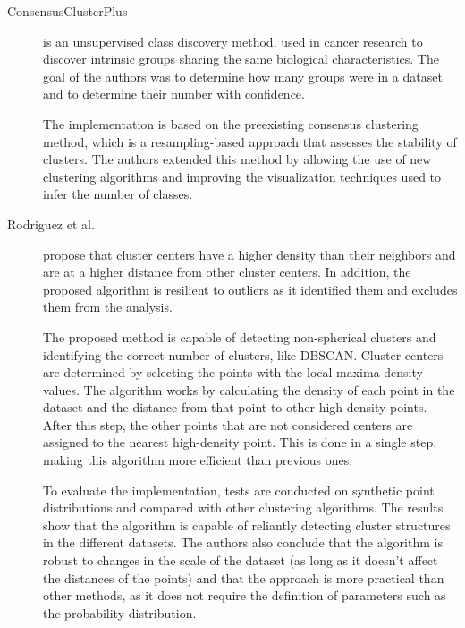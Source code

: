 \begin{description}
    \item[ConsensusClusterPlus] \cite{Wilkerson.Hayes_ConsensusClusterPlusclassdiscovery_2010} is an unsupervised class discovery method, used in cancer research to discover intrinsic groups sharing the same biological characteristics. The goal of the authors was to determine how many groups were in a dataset and to determine their number with confidence.
    
    The implementation is based on the preexisting consensus clustering method, which is a resampling-based approach that assesses the stability of clusters. The authors extended this method by allowing the use of new clustering algorithms and improving the visualization techniques used to infer the number of classes.

\end{description}

\begin{description}
    \item[Rodriguez et al.]\cite{Rodriguez.Laio_Clusteringfastsearch_2014} propose that cluster centers have a higher density than their neighbors and are at a higher distance from other cluster centers. In addition, the proposed algorithm is resilient to outliers as it identified them and excludes them from the analysis. 
    
    The proposed method is capable of detecting non-spherical clusters and identifying the correct number of clusters, like DBSCAN. Cluster centers are determined by selecting the points with the local maxima density values. The algorithm works by calculating the density of each point in the dataset and the distance from that point to other high-density points. After this step, the other points that are not considered centers are assigned to the nearest high-density point. This is done in a single step, making this algorithm more efficient than previous ones. 

    To evaluate the implementation, tests are conducted on synthetic point distributions and compared with other clustering algorithms. The results show that the algorithm is capable of reliantly detecting cluster structures in the different datasets. The authors also conclude that the algorithm is robust to changes in the scale of the dataset (as long as it doesn't affect the distances of the points) and that the approach is more practical than other methods, as it does not require the definition of parameters such as the probability distribution.
\end{description}

